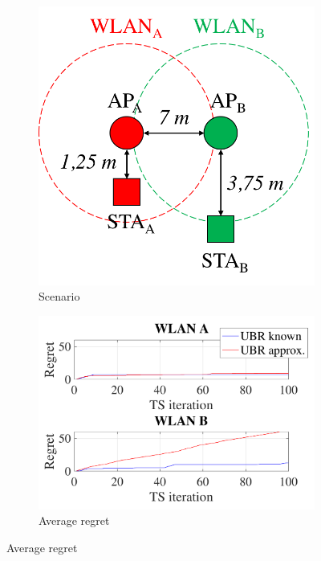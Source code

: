 \documentclass{article}
\begin{document}
\begin{figure}[h!]
	\centering
	\begin{subfigure}[b]{0.25\textwidth}
		\includegraphics[width=\textwidth]{s1_new}
		\caption{Scenario}
		\label{fig:selfish_s3}
	\end{subfigure}
	\begin{subfigure}[b]{0.3\textwidth}
		\includegraphics[width=\textwidth]{approx_vs_actual_regret}
		\caption{Average regret}
		\label{fig:approx_vs_actual_regret}
	\end{subfigure}

\end{figure}
\end{document}
